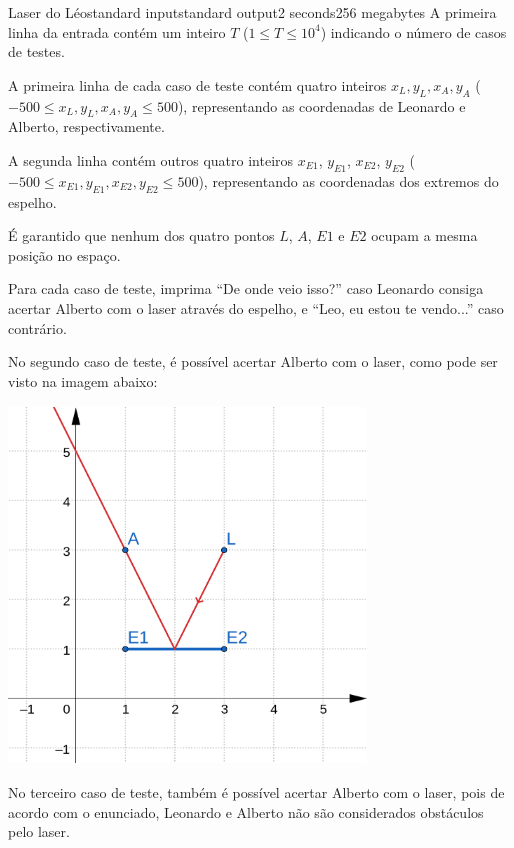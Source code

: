 \begin{problem}{Laser do Léo}{standard input}{standard output}{2 seconds}{256 megabytes}
\InputFile
A primeira linha da entrada contém um inteiro $T$ ($1 \le T \le 10^4$) indicando o número de casos de testes.

A primeira linha de cada caso de teste contém quatro inteiros $x_L, y_L, x_A, y_A$ ($-500 \le x_L, y_L, x_A, y_A \le 500$), representando as coordenadas de Leonardo e Alberto, respectivamente.

A segunda linha contém outros quatro inteiros $x_{E1}$, $y_{E1}$, $x_{E2}$, $y_{E2}$ ($-500 \le x_{E1}, y_{E1}, x_{E2}, y_{E2} \le 500$), representando as coordenadas dos extremos do espelho.

É garantido que nenhum dos quatro pontos $L$, $A$, $E1$ e $E2$ ocupam a mesma posição no espaço.

\OutputFile
Para cada caso de teste, imprima ``De onde veio isso?'' caso Leonardo consiga acertar Alberto com o laser através do espelho, e ``Leo, eu estou te vendo...'' caso contrário.

\Examples

\begin{example}
%
%
%
%
\end{example}

\Note
No segundo caso de teste, é possível acertar Alberto com o laser, como pode ser visto na imagem abaixo:


\begin{center}
\includegraphics[width=9.5cm, height=9.5cm]{Teste2.png}
\end{center}

No terceiro caso de teste, também é possível acertar Alberto com o laser, pois de acordo com o enunciado, Leonardo e Alberto não são considerados obstáculos pelo laser.

\end{problem}

